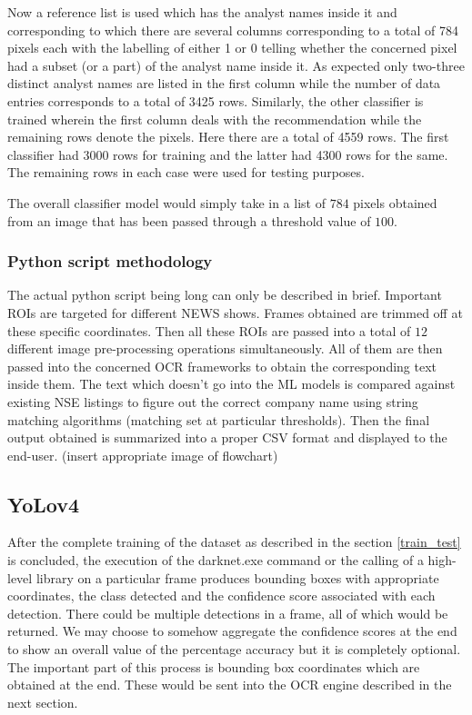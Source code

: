 Now a reference list is used which has the analyst names inside it and corresponding to which there are several columns corresponding to a total of 784 pixels each with the labelling of either 1 or 0 telling whether the concerned pixel had a subset (or a part) of the analyst name inside it. As expected only two-three distinct analyst names are listed in the first column while the number of data entries corresponds to a total of 3425 rows. Similarly, the other classifier is trained wherein the first column deals with the recommendation while the remaining rows denote the pixels. Here there are a total of 4559 rows. The first classifier had 3000 rows for training and the latter had 4300 rows for the same. The remaining rows in each case were used for testing purposes. \par

The overall classifier model would simply take in a list of $784$ pixels obtained from an image that has been passed through a threshold value of $100$.

\subsubsection{Python script methodology}
The actual python script being long can only be described in brief. Important ROIs are targeted for different NEWS shows. Frames obtained are trimmed off at these specific coordinates. Then all these ROIs are passed into a total of $12$ different image pre-processing operations simultaneously. All of them are then passed into the concerned OCR frameworks to obtain the corresponding text inside them. The text which doesn’t go into the ML models is compared against existing NSE listings to figure out the correct company name using string matching algorithms (matching set at particular thresholds). Then the final output obtained is summarized into a proper CSV format and displayed to the end-user.
(insert appropriate image of flowchart)

\subsection{YoLov4} \label{yv4}

After the complete training of the dataset as described in the section \ref{train_test} is concluded, the execution of the {\selectfont darknet.exe} command or the calling of a high-level library on a particular frame produces bounding boxes with appropriate coordinates, the class detected and the confidence score associated with each detection. There could be multiple detections in a frame, all of which would be returned. We may choose to somehow aggregate the confidence scores at the end to show an overall value of the percentage accuracy but it is completely optional. The important part of this process is bounding box coordinates which are obtained at the end. These would be sent into the OCR engine described in the next section.

